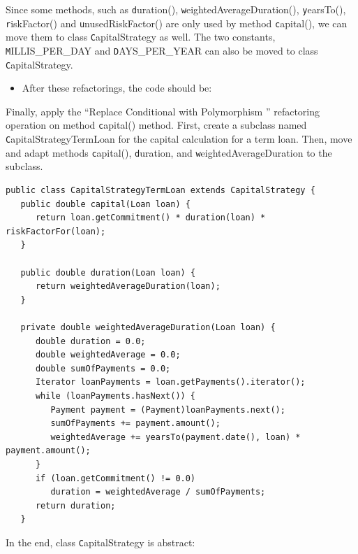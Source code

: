 \documentclass[a4paper,11pt]{memoir}
\newcommand{\code}[1]{{\texttt #1}}
\begin{document}
\begin{exercise}
	Since some methods, such as \code{duration()}, \code{weightedAverageDuration()}, \code{yearsTo()},  \code{riskFactor()} and \code{unusedRiskFactor()} are only used by method \code{capital()}, we can move them to class \code{CapitalStrategy} as well.
	The two constants, \code{MILLIS\_PER\_DAY} and \code{DAYS\_PER\_YEAR} can also be moved to class  \code{CapitalStrategy}.
\end{exercise}
\begin{solution}
	\begin{itemize}
		\item After these refactorings, the code should be: 
	\end{itemize}
	
	\lstset{caption=The CapitalStrategy Class,label=lst:capital:strategy,float=htbp}
	
\end{solution}

\begin{exercise}
	Finally, apply the ``Replace Conditional with Polymorphism '' refactoring operation on method \code{capital()} method. 
	First, create a subclass named \code{CapitalStrategyTermLoan} for the capital calculation for a term loan.
	Then, move and adapt methods \code{capital()}, \code{duration}, and \code{weightedAverageDuration} to the subclass.
\end{exercise}

\begin{solution}
	\begin{lstlisting}[caption=cap,label=lst:lab]
public class CapitalStrategyTermLoan extends CapitalStrategy {
   public double capital(Loan loan) {
      return loan.getCommitment() * duration(loan) * riskFactorFor(loan);
   }

   public double duration(Loan loan) {
      return weightedAverageDuration(loan);
   }

   private double weightedAverageDuration(Loan loan) {
      double duration = 0.0;
      double weightedAverage = 0.0;
      double sumOfPayments = 0.0;
      Iterator loanPayments = loan.getPayments().iterator();
      while (loanPayments.hasNext()) {
         Payment payment = (Payment)loanPayments.next();
         sumOfPayments += payment.amount();
         weightedAverage += yearsTo(payment.date(), loan) * payment.amount();
      }
      if (loan.getCommitment() != 0.0)
         duration = weightedAverage / sumOfPayments;
      return duration;
   }		
	\end{lstlisting}

In the end, class \code{CapitalStrategy} is abstract:


	

	
\end{solution}



\end{document}
